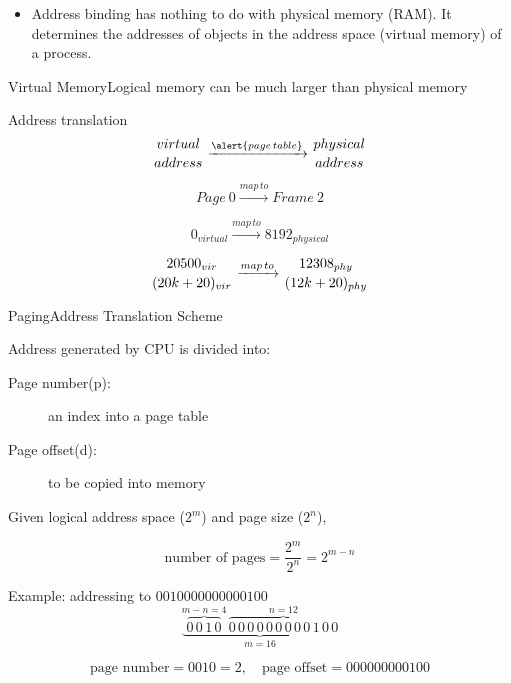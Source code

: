 \begin{itemize}
\item Address binding has nothing to do with physical memory (RAM). It determines the
  addresses of objects in the address space (virtual memory) of a process.
\end{itemize}

\begin{frame}{Virtual Memory}{Logical memory can be much larger than physical memory}
  \begin{minipage}{.48\textwidth}
  \end{minipage}\hfill
  \begin{minipage}{.48\textwidth}
    \begin{block}{Address translation}
      $$\genfrac{}{}{0pt}{}{virtual}{address}
      \xrightarrow{\alert{page\,table}}
      \genfrac{}{}{0pt}{}{physical}{address}$$
      
      $$Page\ 0\xrightarrow{map\,to}Frame\ 2$$
      
      $$0_{virtual}\xrightarrow{map\,to}8192_{physical}$$
      
      $$\genfrac{}{}{0pt}{}{20500_{vir}}{(20k+20)_{vir}}
      \xrightarrow{map\,to} \genfrac{}{}{0pt}{}{12308_{phy}}{(12k+20)_{phy}}$$
    \end{block}
  \end{minipage}
\end{frame}

\begin{frame}{Paging}{Address Translation Scheme}
  \begin{block}{Address generated by CPU is divided into:}
    \begin{description}
    \item[Page number(p):] an index into a page table
    \item[Page offset(d):] to be copied into memory
    \end{description}
  \end{block}
  Given \alert{logical address space} ($2^m$) and \alert{page size} ($2^n$),
  \begin{small}
    $$\text{number of pages}=\frac{2^m}{2^n}=2^{m-n}$$
  \end{small}
  \begin{block}{Example: addressing to $0010000000000100$}
    $$\underbrace{\overbrace{0\,0\,1\,0}^{m-n=4}\,\overbrace{0\,0\,0\,0\,0\,0\,0\,0\,0\,1\,0\,0}^{n=12}}_{m=16}$$
    \begin{small}
      $$\text{page number}=0010=2, \quad \text{page offset}=000000000100$$
    \end{small}
  \end{block}
\end{frame}

